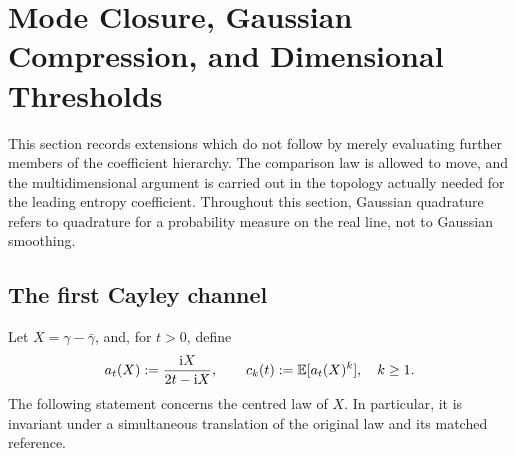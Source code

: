 \section{Mode Closure, Gaussian Compression, and Dimensional Thresholds}
\label{sec:verified-A2-results}

This section records extensions which do not follow by merely evaluating
further members of the coefficient hierarchy.  The comparison law is allowed
to move, and the multidimensional argument is carried out in the topology
actually needed for the leading entropy coefficient.  Throughout this
section, Gaussian quadrature refers to quadrature for a probability measure
on the real line, not to Gaussian smoothing.

\subsection{The first Cayley channel}

Let \(X=\gamma-\bar\gamma\), and, for \(t>0\), define
\begin{equation}\label{eq:first-cayley-channel-definition}
 a_t(X):=\frac{\mathrm{i} X}{2t-\mathrm{i} X},
 \qquad c_k(t):=\mathbb{E}[a_t(X)^k],\quad k\ge1.
\end{equation}
The following statement concerns the centred law of \(X\).  In particular,
it is invariant under a simultaneous translation of the original law and
its matched reference.

